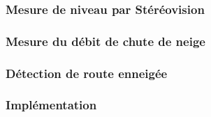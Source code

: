 \subsubsection{Mesure de niveau par Stéréovision}

\subsubsection{Mesure du débit de chute de neige}

\subsubsection{Détection de route enneigée}

\subsubsection{Implémentation}


